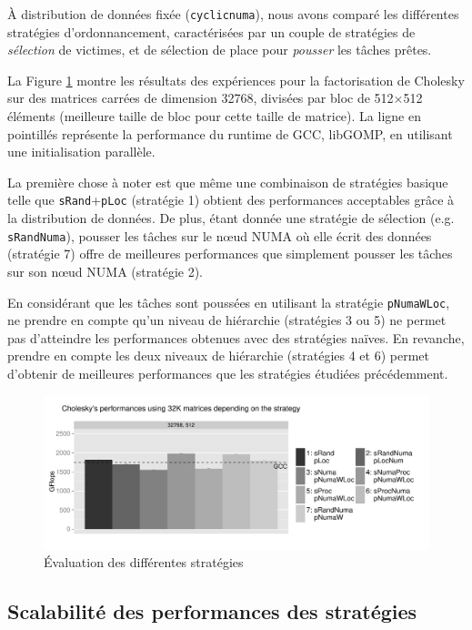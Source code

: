\documentclass[parallelisme]{compas2016}
\begin{document}
À distribution de données fixée (\verb/cyclicnuma/), nous avons comparé les
différentes stratégies d'ordonnancement, caractérisées par un couple de stratégies de
\emph{sélection} de victimes, et de sélection de place pour \emph{pousser} les tâches prêtes.

La Figure \ref{fig:eval-all-strat} montre les résultats des expériences pour
la factorisation de Cholesky sur des matrices carrées de dimension 32768, divisées par
bloc de 512$\times$512 éléments (meilleure taille de bloc pour cette taille de matrice).
La ligne en pointillés représente la performance du runtime de GCC,
libGOMP, en utilisant une initialisation parallèle.

La première chose à noter est que même une combinaison de stratégies basique
telle que \verb/sRand/+\verb/pLoc/ (stratégie 1) obtient des performances
acceptables grâce à la distribution de données.
De plus, étant donnée une stratégie de sélection (e.g. \verb/sRandNuma/), pousser
les tâches sur le nœud NUMA où elle écrit des données (stratégie 7) offre
de meilleures performances que simplement pousser les tâches sur son nœud NUMA (stratégie 2).

En considérant que les tâches sont poussées en utilisant la stratégie \verb/pNumaWLoc/,
ne prendre en compte qu'un niveau de hiérarchie (stratégies 3 ou 5) ne permet
pas d'atteindre les performances obtenues avec des stratégies naïves. En revanche,
prendre en compte les deux niveaux de hiérarchie (stratégies 4 et 6)
permet d'obtenir de meilleures performances que les stratégies étudiées précédemment.

\begin{figure}[t]
  \centering
  \includegraphics[scale=0.5]{figures/graph_all_strat.pdf}
  \caption{Évaluation des différentes stratégies}
\label{fig:eval-all-strat}
\vspace*{-5ex}
\end{figure}


\subsection{Scalabilité des performances des stratégies}
\end{document}
